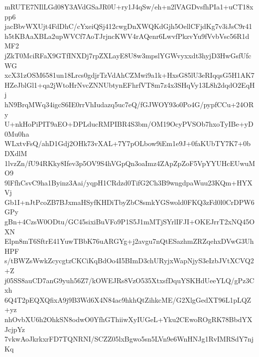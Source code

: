 mRUTE7NIlLGd08Y3AVdGSaJR0U+ry1J4qSw/eh+n2lVAGDvsfhPIa1+uCT18xpp6
jacBbvWXUjt4FdDhC/cYxeiQSj412cwgDnXWQKdGjh5OellCFjdKg7v3iJsC9r41
h5tKBAaXBLa2upWVCf7AoTJrjncKWV4rAQenr6LwvfPkzvYu9fVvbVsc56R1dMF2
jZkT0MciRFaX9GTfINXDj7rpZXLayE8U8w3mpslYGWvyxxdt3hyjD3HwGsfUfcWG
xcX31zOSM6581un18Lrcs0gdjrTzVdAhCZMwi9a1k+HxsG85lU3eRIqqsG5H1AK7
HZeJblGl1+qa2jWtoHrNvcZNNUbtynEFhrfVT8m7z4x3SHqVy13L8h2dqdO2EqHj
hN9BrqMWq34igcS6IE0rrVhIudazq5uc7eQ/fGJWOY93o0Po4G/pypfCCu+24ORy
U+nkHoPiPIT9aEO+DPLducRMPIBR4S3bm/OM19OcyPVSOb7hxoTyIBe+yD0Mu0ha
WLxtvFsQ/ahD1Gdj2OHk73vXAL+7Y7pOLbow9iEm1e9J+0faKUbTY7K7+0bDXdlM
1lvzZn/fU94RKky8Ifev3p5OV9S4hVGpQn3oaImz4ZApZpZoF5VpYYUHcEUwuMO9
9lFfhCsvC9ha1Byinz3Aai/yqpH1CRdzd0TifG2Ch3B9wngdpaWuu23KQm+HYXVj
Gb1I+nJtPcoZB7BJxmaHSyfKHDiTbyZbC8smkYGSwold0FKQ3zFd0l0CrDPW6GPy
gBn+4CzsW0ODtu/GC45sixiBuVFo9P1S5J1mMTjSYrlIFJI+OKEJrrT2xNQ45OXN
Elpn8mT6SftrE41YuwTBbK76uARGYg+j2avgu7nQtESazhmZRZqehxDVwG3UhHPF
s/tBWZsWwkZcycgtzCKCiKqBdOo4I5BImD3chURyjxWapNjyS3eIzbJVtXCVQ2+Z
j05SS8auCD7anG9yuh56Z7/kOWEJRs8VzO535XtxsfDquYSKHdUeeYLQ/gPz3Cxh
6Q4T2pEQXQfixA9j9B3Wd6X4N84ac9hkhQtZihkcME/G2XlgGedXT96L1pLQZ+yz
nhOvbXU6h2OhkSN8odwO0YfhGThiiwXyIUGeL+Yku2CEwoROgRK78BbdYXJcjpYz
7vkwAoJkrkxrFD7TQNRNI/SCZZ05lxBgwo5sn5LVn9e6WnHNJg1RvIMRSdY7njKq
